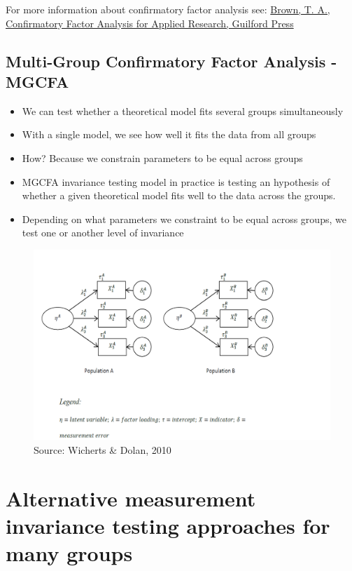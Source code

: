 \documentclass[
]{book}
\begin{document}
For more information about confirmatory factor analysis see: \href{https://www.guilford.com/books/Confirmatory-Factor-Analysis-for-Applied-Research/Timothy-Brown/9781462515363}{Brown, T. A., Confirmatory Factor Analysis for Applied Research, Guilford Press}

\hypertarget{multi-group-confirmatory-factor-analysis---mgcfa}{%
\section{Multi-Group Confirmatory Factor Analysis - MGCFA}\label{multi-group-confirmatory-factor-analysis---mgcfa}}

\begin{itemize}
\item
  We can test whether a theoretical model fits several groups simultaneously
\item
  With a single model, we see how well it fits the data from all groups
\item
  How? Because we constrain parameters to be equal across groups
\item
  MGCFA invariance testing model in practice is testing an hypothesis of whether a given theoretical model fits well to the data across the groups.
\item
  Depending on what parameters we constraint to be equal across groups, we test one or another level of invariance
\end{itemize}

\begin{figure}
\includegraphics[width=0.8\linewidth]{multi_group} \caption{Source: Wicherts & Dolan, 2010}\label{fig:mgcfa}
\end{figure}

\hypertarget{alternative-measurement-invariance-testing-approaches-for-many-groups}{%
\chapter{Alternative measurement invariance testing approaches for many groups}\label{alternative-measurement-invariance-testing-approaches-for-many-groups}}
\end{document}

